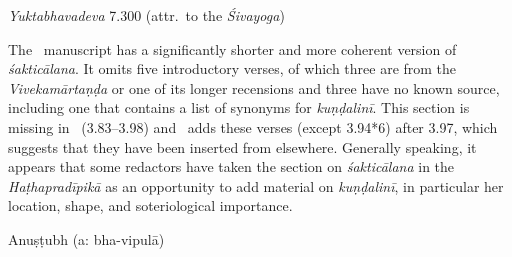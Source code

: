 \begin{ekdosis}
\begin{testimonia}[hp03_094_2]
\emph{Yuktabhavadeva} 7.300 (attr.~to the \emph{Śivayoga})
\begin{versinnote}
\end{versinnote}


\end{testimonia}

\begin{philcomm}[hp03_094_2]
The \alphaThree\ manuscript has a significantly shorter and more coherent version of \emph{śakticālana}. It omits five introductory verses, of which three are from the \emph{Vivekamārtaṇḍa} or one of its longer recensions and three have no known source, including one that contains a list of synonyms for \emph{kuṇḍalinī}. This section is missing in \alphaOne\ (3.83–3.98) and \alphaTwo\ adds these verses (except 3.94*6) after 3.97, which suggests that they have been inserted from elsewhere. Generally speaking, it appears that some redactors have taken the section on \emph{śakticālana} in the \emph{Haṭhapradīpikā} as an opportunity to add material on \emph{kuṇḍalinī}, in particular her location, shape, and soteriological importance. 

\end{philcomm}

\begin{metre}[hp03_094_2]
Anuṣṭubh (a: bha-vipulā)
\end{metre}


\end{ekdosis}
